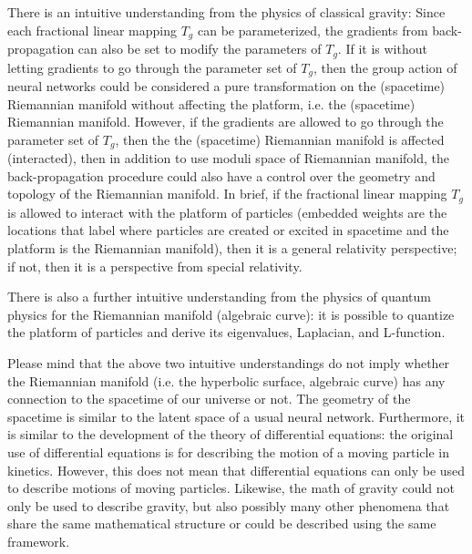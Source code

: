 \documentclass{article}
\theoremstyle{plain}
\theoremstyle{plain} %
\theoremstyle{definition}  %
\theoremstyle{remark}  %
\theoremstyle{plain}
\begin{document}
There is an intuitive understanding from the physics of classical gravity:
Since each fractional linear mapping $T_g$ can be parameterized\cite{seppala2011geometry, ford2004automorphic}, the gradients from back-propagation can also be set to modify the parameters of $T_g$. If it is without letting gradients to go through the parameter set of $T_g$, then the group action of neural networks could be considered a pure transformation on the (spacetime) Riemannian manifold without affecting the platform, i.e. the (spacetime) Riemannian manifold. However, if the gradients are allowed to go through the parameter set of $T_g$, then the the (spacetime) Riemannian manifold is affected (interacted), then in addition to use moduli space of Riemannian manifold, the back-propagation procedure could also have a control over the geometry and topology of the Riemannian manifold.
In brief, if the fractional linear mapping $T_g$ is allowed to interact with the platform of particles (embedded weights are the locations that label where particles are created or excited in spacetime and the platform is the Riemannian manifold), then it is a general relativity perspective\cite{misner1973gravitation}; if not, then it is a perspective from special relativity\cite{misner1973gravitation}.

There is also a further intuitive understanding from the physics of quantum physics for the Riemannian manifold (algebraic curve\cite{hori2003mirror}): it is possible to quantize the platform of particles and derive its eigenvalues, Laplacian, and L-function\cite{borthwick2007spectral}.

Please mind that the above two intuitive understandings do not imply whether the Riemannian manifold (i.e. the hyperbolic surface, algebraic curve) has any connection to the spacetime of our universe or not. The geometry of the spacetime is similar to the latent space of a usual neural network. Furthermore, it is similar to the development of the theory of differential equations: the original use of differential equations is for describing the motion of a moving particle in kinetics. However, this does not mean that differential equations can only be used to describe motions of moving particles. Likewise, the math of gravity could not only be used to describe gravity, but also possibly many other phenomena that share the same mathematical structure or could be described using the same framework.  
\end{document}
